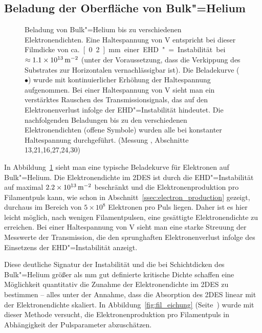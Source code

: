 \subsection{Beladung der Oberfläche von Bulk"=Helium}
\begin{figure}[h!tbp]
    \begin{minipage}[b]{\textwidth-\smidwidth-\tabcolsep}
        \caption[Beladung von Bulk"=Helium]{Beladung von Bulk"=Helium bis zu verschiedenen Elektronendichten. Eine Haltespannung von \unit[38]{V} entspricht bei dieser Filmdicke von ca.\ \unit[0.2]{mm} einer EHD"=Instabilität bei $\approx\unit[1.1\times10^{13}]{\Em}$ (unter der Voraussetzung, dass die Verkippung des Substrates zur Horizontalen vernachlässigbar ist). Die Beladekurve ($\bullet$) wurde mit kontinuierlicher Erhöhung der Haltespannung aufgenommen. Bei einer Haltespannung von \unit[38]{V} sieht man ein verstärktes Rauschen des Transmissionsignals, das auf den Elektronenverlust infolge der EHD"=Instabilität hindeutet. Die nachfolgenden Beladungen bis zu den verschiedenen Elektronendichten (offene Symbole) wurden alle bei konstanter Haltespannung durchgeführt. (Messung , Abschnitte 13,21,16,27,24,30)}
        \label{fig:bulk_charge}
    \end{minipage}
\end{figure}

In Abbildung~\ref{fig:bulk_charge} sieht man eine typische Beladekurve für Elektronen auf Bulk"=Helium. Die Elektronendichte im 2DES ist durch die EHD"=Instabilität auf maximal $\unit[2.2\times10^{13}]{\Em}$ beschränkt und die Elektronenproduktion pro Filamentpuls kann, wie schon in Abschnitt~\ref{ssec:electron_production} gezeigt, durchaus im Bereich von $5\times10^{8}$ Elektronen pro Puls liegen. Daher ist es hier leicht möglich, nach wenigen Filamentpulsen, eine gesättigte Elektronendichte zu erreichen. Bei einer Haltespannung von \unit[38]{V} sieht man eine starke Streuung der Messwerte der Transmission, die den sprunghaften Elektronenverlust infolge des Einsetzens der EHD"=Instabilität anzeigt.

Diese deutliche Signatur der Instabilität und die bei Schichtdicken des Bulk"=Helium größer als \unit[1]{mm} gut definierte kritische Dichte schaffen eine Möglichkeit quantitativ die Zunahme der Elektronendichte im 2DES zu bestimmen -- alles unter der Annahme, dass die Absorption des 2DES linear mit der Elektronendichte skaliert. In Abbildung~\ref{fig:fil_eichung} (Seite~\pageref{fig:fil_eichung}) wurde mit dieser Methode versucht, die Elektronenproduktion pro Filamentpuls in Abhängigkeit der Pulsparameter abzuschätzen. 

